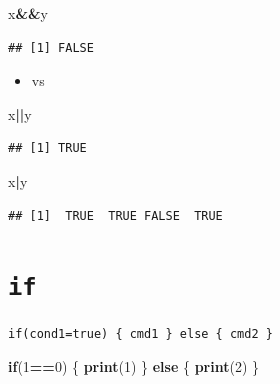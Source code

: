 \documentclass[]{book}
\newenvironment{Shaded}{\begin{snugshade}}{\end{snugshade}}
\newcommand{\KeywordTok}[1]{\textcolor[rgb]{0.13,0.29,0.53}{\textbf{#1}}}
\newcommand{\DecValTok}[1]{\textcolor[rgb]{0.00,0.00,0.81}{#1}}
\newcommand{\ControlFlowTok}[1]{\textcolor[rgb]{0.13,0.29,0.53}{\textbf{#1}}}
\newcommand{\OperatorTok}[1]{\textcolor[rgb]{0.81,0.36,0.00}{\textbf{#1}}}
\newcommand{\NormalTok}[1]{#1}
\providecommand{\tightlist}{%
  \setlength{\itemsep}{0pt}\setlength{\parskip}{0pt}}
\begin{document}
\begin{Shaded}
\begin{Highlighting}[]
\NormalTok{x}\OperatorTok{&&}\NormalTok{y}
\end{Highlighting}
\end{Shaded}

\begin{verbatim}
## [1] FALSE
\end{verbatim}

\begin{itemize}
\tightlist
\item
  \texttt{\textbar{}\textbar{}} vs \texttt{\textbar{}}
\end{itemize}

\begin{Shaded}
\begin{Highlighting}[]
\NormalTok{x}\OperatorTok{||}\NormalTok{y}
\end{Highlighting}
\end{Shaded}

\begin{verbatim}
## [1] TRUE
\end{verbatim}

\begin{Shaded}
\begin{Highlighting}[]
\NormalTok{x}\OperatorTok{|}\NormalTok{y}
\end{Highlighting}
\end{Shaded}

\begin{verbatim}
## [1]  TRUE  TRUE FALSE  TRUE
\end{verbatim}

\section{\texorpdfstring{\texttt{if}}{if}}\label{if}

\texttt{if(cond1=true)\ \{\ cmd1\ \}\ else\ \{\ cmd2\ \}}

\begin{Shaded}
\begin{Highlighting}[]
\ControlFlowTok{if}\NormalTok{(}\DecValTok{1}\OperatorTok{==}\DecValTok{0}\NormalTok{) \{}
    \KeywordTok{print}\NormalTok{(}\DecValTok{1}\NormalTok{)}
\NormalTok{\} }\ControlFlowTok{else}\NormalTok{ \{}
    \KeywordTok{print}\NormalTok{(}\DecValTok{2}\NormalTok{)}
\NormalTok{\}}
\end{Highlighting}
\end{Shaded}
\end{document}
